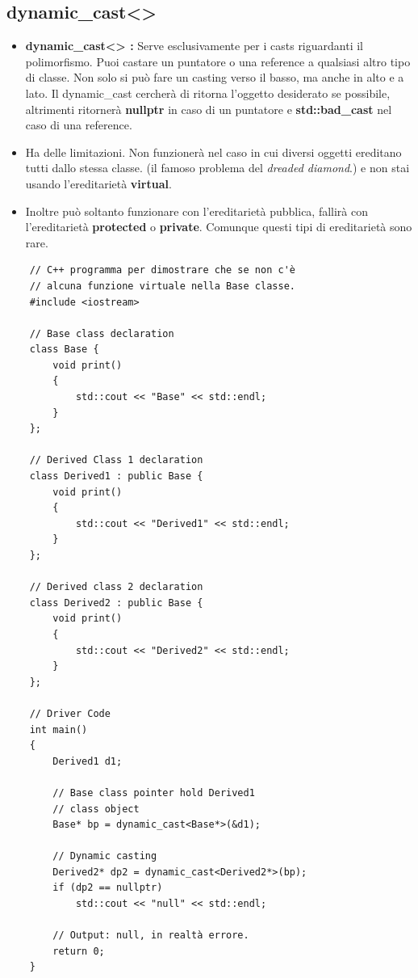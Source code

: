 \subsection{dynamic\_cast<>}

\begin{itemize}
	\item \textsf{\small \textbf{dynamic\_cast<> :} Serve esclusivamente per i casts riguardanti il polimorfismo. Puoi castare un puntatore o una reference a qualsiasi altro tipo di classe. Non solo si può fare un casting verso il basso, ma anche in alto e a lato. Il dynamic\_cast cercherà di ritorna l'oggetto desiderato se possibile, altrimenti ritornerà \textbf{nullptr} in caso di un puntatore e \textbf{std::bad\_cast} nel caso di una reference.}
	\item \textsf{\small Ha delle limitazioni. Non funzionerà nel caso in cui diversi oggetti ereditano tutti dallo stessa classe. (il famoso problema del \emph{dreaded diamond}.) e non stai usando l'ereditarietà \textbf{virtual}.}
	\item \textsf{\small Inoltre può soltanto funzionare con l'ereditarietà pubblica, fallirà con l'ereditarietà \textbf{protected} o \textbf{private}. Comunque questi tipi di ereditarietà sono rare.}
\end{itemize}

\begin{lstlisting}
	// C++ programma per dimostrare che se non c'è
	// alcuna funzione virtuale nella Base classe.
	#include <iostream>
	
	// Base class declaration
	class Base {
		void print()
		{
			std::cout << "Base" << std::endl;
		}
	};
	
	// Derived Class 1 declaration
	class Derived1 : public Base {
		void print()
		{
			std::cout << "Derived1" << std::endl;
		}
	};
	
	// Derived class 2 declaration
	class Derived2 : public Base {
		void print()
		{
			std::cout << "Derived2" << std::endl;
		}
	};
	
	// Driver Code
	int main()
	{
		Derived1 d1;
		
		// Base class pointer hold Derived1
		// class object
		Base* bp = dynamic_cast<Base*>(&d1);
		
		// Dynamic casting
		Derived2* dp2 = dynamic_cast<Derived2*>(bp);
		if (dp2 == nullptr)
			std::cout << "null" << std::endl;
			
		// Output: null, in realtà errore.
		return 0;
	}
\end{lstlisting}

